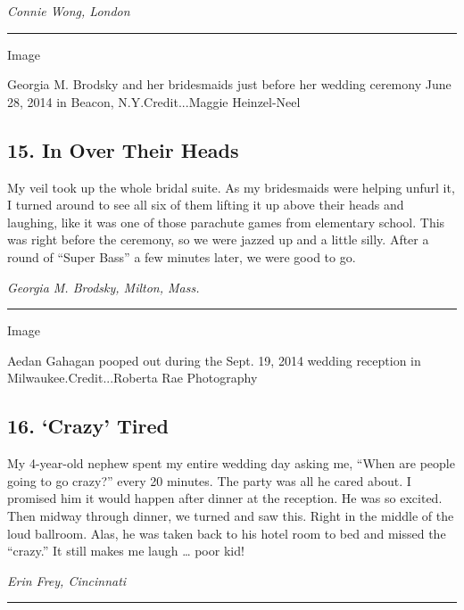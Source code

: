 \emph{Connie Wong, London}

\begin{center}\rule{0.5\linewidth}{\linethickness}\end{center}

Image

Georgia M. Brodsky and her bridesmaids just before her wedding ceremony
June 28, 2014 in Beacon, N.Y.Credit...Maggie Heinzel-Neel

\hypertarget{15-in-over-their-heads}{%
\subsection{15. In Over Their Heads}\label{15-in-over-their-heads}}

My veil took up the whole bridal suite. As my bridesmaids were helping
unfurl it, I turned around to see all six of them lifting it up above
their heads and laughing, like it was one of those parachute games from
elementary school. This was right before the ceremony, so we were jazzed
up and a little silly. After a round of ``Super Bass'' a few minutes
later, we were good to go.

\emph{Georgia M. Brodsky, Milton, Mass.}

\begin{center}\rule{0.5\linewidth}{\linethickness}\end{center}

Image

Aedan Gahagan pooped out during the Sept. 19, 2014 wedding reception in
Milwaukee.Credit...Roberta Rae Photography

\hypertarget{16-crazy-tired}{%
\subsection{16. `Crazy' Tired}\label{16-crazy-tired}}

My 4-year-old nephew spent my entire wedding day asking me, ``When are
people going to go crazy?'' every 20 minutes. The party was all he cared
about. I promised him it would happen after dinner at the reception. He
was so excited. Then midway through dinner, we turned and saw this.
Right in the middle of the loud ballroom. Alas, he was taken back to his
hotel room to bed and missed the ``crazy.'' It still makes me laugh
\ldots{} poor kid!

\emph{Erin Frey, Cincinnati}

\begin{center}\rule{0.5\linewidth}{\linethickness}\end{center}

